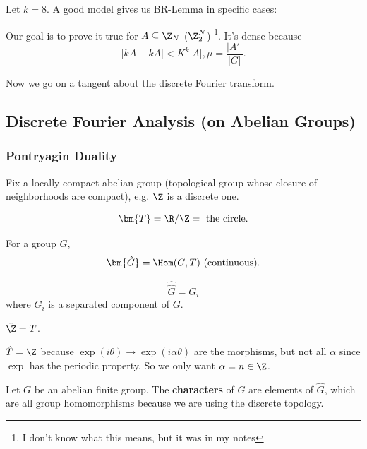 \documentclass[a4paper]{article}
\begin{document}
Let $k=8 $.
A good model gives us BR-Lemma in specific cases:

Our goal is to prove it true for $A\subseteq \Z_N $ ($\Z_2^N $) \footnote{I don't know what this means, but it was in my notes}.
It's dense because
\[
	|kA-kA| < K^{k}|A|, \mu = \frac{|A'|}{|G|}
.\]

Now we go on a tangent about the discrete Fourier transform.

\subsection{Discrete Fourier Analysis (on Abelian Groups)}

\subsubsection{Pontryagin Duality}

Fix a locally compact abelian group (topological group whose closure of neighborhoods are compact), e.g. $\Z $ is a discrete one.

\begin{definition}
\[
	\bm{T} = \R / \Z = \text{ the circle}
.\]
\end{definition}

\begin{definition}
	For a group $G $,
	\[
		\bm{\hat{G}} = \Hom(G,T) \text{ (continuous)}
	.\]
\end{definition}

\begin{thm}
	\[
		\hat{\hat{G} } = G_i
	\]
	where $G_i$ is a separated component of $G $.
\end{thm}

\begin{example}
	$\hat{\Z} = T  $.
\end{example}

\begin{example}
	$\hat{T} = \Z  $ because $\exp(i\theta) \to \exp(i\alpha \theta ) $ are the morphisms, but not all $\alpha $ since $\exp $ has the periodic property.
	So we only want $\alpha = n \in \Z$.
\end{example}

\begin{definition}
 	Let $G $ be an abelian finite group.
	The \textbf{characters} of $G $ are elements of $\hat{G}  $, which are all group homomorphisms because we are using the discrete topology.
\end{definition}
\end{document}
